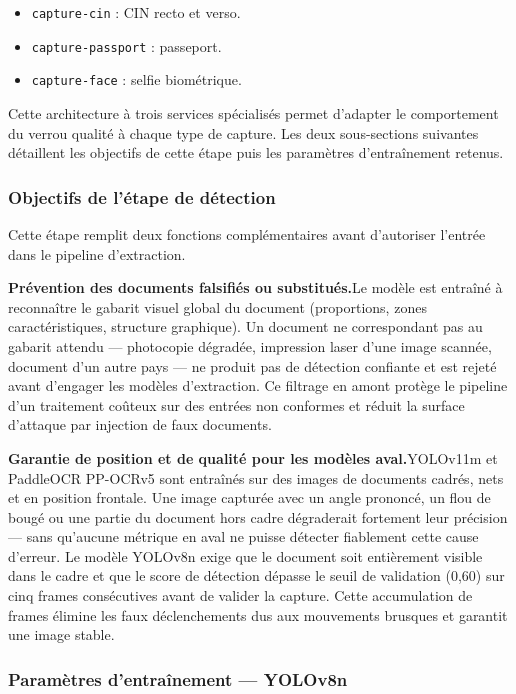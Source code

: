 \begin{itemize}
  \item \texttt{capture-cin} : CIN recto et verso.
  \item \texttt{capture-passport} : passeport.
  \item \texttt{capture-face} : selfie biométrique.
\end{itemize}

Cette architecture à trois services spécialisés permet d'adapter le comportement du verrou qualité à chaque type de capture. Les deux sous-sections suivantes détaillent les objectifs de cette étape puis les paramètres d'entraînement retenus.

\subsubsection{Objectifs de l'étape de détection}

Cette étape remplit deux fonctions complémentaires avant d'autoriser l'entrée dans le pipeline d'extraction.

\medskip
\noindent\textbf{Prévention des documents falsifiés ou substitués.}\quad Le modèle est entraîné à reconnaître le gabarit visuel global du document (proportions, zones caractéristiques, structure graphique). Un document ne correspondant pas au gabarit attendu --- photocopie dégradée, impression laser d'une image scannée, document d'un autre pays --- ne produit pas de détection confiante et est rejeté avant d'engager les modèles d'extraction. Ce filtrage en amont protège le pipeline d'un traitement coûteux sur des entrées non conformes et réduit la surface d'attaque par injection de faux documents.

\medskip
\noindent\textbf{Garantie de position et de qualité pour les modèles aval.}\quad YOLOv11m et PaddleOCR PP-OCRv5 sont entraînés sur des images de documents cadrés, nets et en position frontale. Une image capturée avec un angle prononcé, un flou de bougé ou une partie du document hors cadre dégraderait fortement leur précision --- sans qu'aucune métrique en aval ne puisse détecter fiablement cette cause d'erreur. Le modèle YOLOv8n exige que le document soit entièrement visible dans le cadre et que le score de détection dépasse le seuil de validation (0,60) sur cinq frames consécutives avant de valider la capture. Cette accumulation de frames élimine les faux déclenchements dus aux mouvements brusques et garantit une image stable.

\subsubsection{Paramètres d'entraînement --- YOLOv8n}

